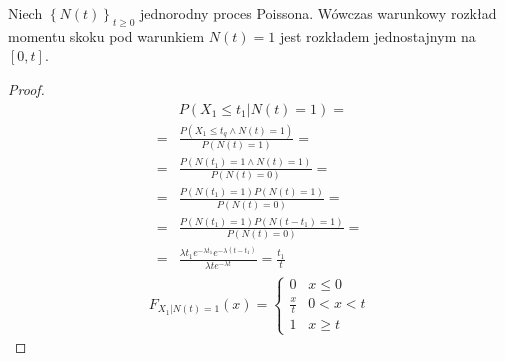\begin{twr}
Niech $ \left\{N(t)\right\}_{t\ge 0} $ jednorodny proces Poissona. Wówczas warunkowy rozkład momentu skoku pod warunkiem $ N(t)=1 $ jest rozkładem jednostajnym na $ [0,t] $.
\begin{proof}
\begin{align*}
&P\left(X_1\le t_1|N(t)=1\right)
=\\=&
\frac{P\left(X_1\le t_q\wedge N(t)=1\right)}{P\left(N(t)=1\right)}
=\\=&
\frac{P\left(N(t_1)=1\wedge N(t)=1\right)}{P\left(N(t)=0\right)}
=\\=&
\frac{P\left(N(t_1)=1\right)P\left(N(t)=1\right)}{P\left(N(t)=0\right)}
=\\=&
\frac{P\left(N(t_1)=1\right)P\left(N(t-t_1)=1\right)}{P\left(N(t)=0\right)}
=\\=&
\frac{\lambda t_1e^{-\lambda t_1}e^{-\lambda (t-t_1)}}{\lambda te^{-\lambda t}}=\frac{t_1}{t}
\end{align*}
\begin{gather*}
F_{X_1|N(t)=1}(x)=
\left \{
\begin{array}{cr}
	     0      &  x\le0 \\
	\frac{x}{t} &  0<x<t \\
	     1      & x\ge t
\end{array}
\right .
\end{gather*}
\end{proof}
\end{twr}
